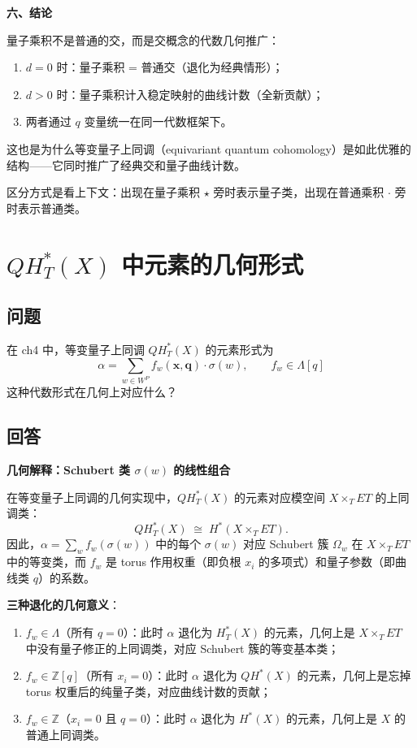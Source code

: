 \textbf{六、结论}

量子乘积不是普通的交，而是交概念的代数几何推广：
\begin{enumerate}
\item $d = 0$ 时：量子乘积 = 普通交（退化为经典情形）；
\item $d > 0$ 时：量子乘积计入稳定映射的曲线计数（全新贡献）；
\item 两者通过 $q$ 变量统一在同一代数框架下。
\end{enumerate}
这也是为什么等变量子上同调（equivariant quantum cohomology）是如此优雅的结构——它同时推广了经典交和量子曲线计数。

区分方式是看上下文：出现在量子乘积 $\star$ 旁时表示量子类，出现在普通乘积 $\cdot$ 旁时表示普通类。
\section{$QH_T^*(X)$ 中元素的几何形式}\label{sec:qa-eqc-element-geometry}
\subsection{问题}
在 ch4 中，等变量子上同调 $QH_T^*(X)$ 的元素形式为
$$\alpha = \sum_{w \in W^P} f_w(\mathbf{x}, \mathbf{q}) \cdot \sigma(w), \qquad f_w \in \Lambda[q]$$
这种代数形式在几何上对应什么？
\subsection{回答}
\textbf{几何解释：Schubert 类 $\sigma(w)$ 的线性组合}

在等变量子上同调的几何实现中，$QH_T^*(X)$ 的元素对应模空间 $X \times_T ET$ 的上同调类：
$$QH_T^*(X) \;\cong\; H^*(X \times_T ET).$$
因此，$\alpha = \sum_w f_w(\sigma(w))$ 中的每个 $\sigma(w)$ 对应 Schubert 簇 $\Omega_w$ 在 $X \times_T ET$ 中的等变类，而 $f_w$ 是 torus 作用权重（即负根 $x_i$ 的多项式）和量子参数（即曲线类 $q$）的系数。

\textbf{三种退化的几何意义}：
\begin{enumerate}
\item $f_w \in \Lambda$（所有 $q = 0$）：此时 $\alpha$ 退化为 $H_T^*(X)$ 的元素，几何上是 $X \times_T ET$ 中没有量子修正的上同调类，对应 Schubert 簇的等变基本类；
\item $f_w \in \mathbb{Z}[q]$（所有 $x_i = 0$）：此时 $\alpha$ 退化为 $QH^*(X)$ 的元素，几何上是忘掉 torus 权重后的纯量子类，对应曲线计数的贡献；
\item $f_w \in \mathbb{Z}$（$x_i = 0$ 且 $q = 0$）：此时 $\alpha$ 退化为 $H^*(X)$ 的元素，几何上是 $X$ 的普通上同调类。
\end{enumerate}

